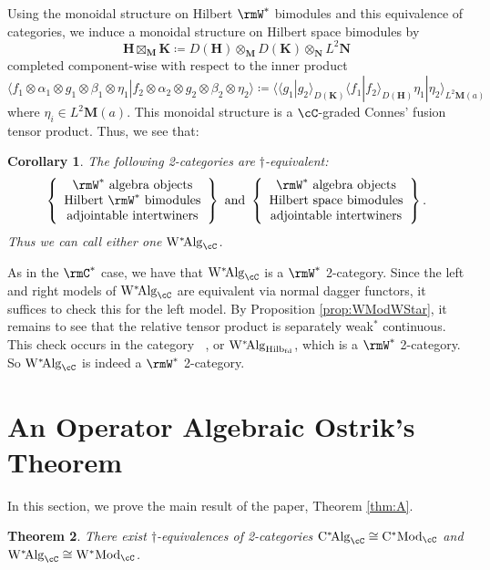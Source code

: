 \documentclass[11pt,reqno]{amsart}
\DeclareMathOperator{\Hilb}{Hilb}
\DeclareMathOperator{\CMod}{C^*Mod}
\DeclareMathOperator{\WMod}{W^*Mod}
\DeclareMathOperator{\CAlg}{C^*\!Alg}
\DeclareMathOperator{\WAlg}{W^*\!Alg}
\newcommand{\bb}[1]{\mathbf{#1}}
\numberwithin{equation}{section}
\theoremstyle{plain}
\newtheorem{thm}{Theorem}[section]
\newtheorem{cor}[thm]{Corollary}
\begin{document}
Using the monoidal structure on Hilbert $\rmW^*$ bimodules and this equivalence of categories, we induce a monoidal structure on Hilbert space bimodules by $$\bb{H} \boxtimes_{\bb M} \bb K \coloneq D(\bb H) \otimes_{\bb M} D(\bb K) \otimes_{\bb N} L^2 \bb N$$ completed component-wise with respect to the inner product $$\langle f_1 \otimes \alpha_1 \otimes g_1 \otimes \beta_1 \otimes \eta_1 | f_2 \otimes \alpha_2 \otimes g_2 \otimes \beta_2 \otimes \eta_2\rangle \coloneq \langle \langle g_1 | g_2 \rangle_{D(\bb K)} \langle f_1 | f_2 \rangle_{D(\bb H)} \eta_1 | \eta_2 \rangle_{L^2 \bb M(a)}$$ where $\eta_i \in L^2 \bb M(a)$.
This monoidal structure is a $\cC$-graded Connes' fusion tensor product.
Thus, we see that:

\begin{cor} \label{cor:WAlgwelldef}
The following 2-categories are $\dagger$-equivalent:
\[
  \left\{ \begin{array}{c}
    \rmW^* \text{ algebra objects} \\
    \text{Hilbert } \rmW^* \text{ bimodules} \\
    \text{adjointable intertwiners}
  \end{array}\right\}
  \text{ and }
  \left\{ \begin{array}{c}
    \rmW^* \text{ algebra objects} \\
    \text{Hilbert space bimodules} \\
    \text{adjointable intertwiners}
  \end{array}\right\}.
\]
Thus we can call either one $\WAlg_{\cC}$.
\end{cor}
As in the $\rmC^*$ case, we have that $\WAlg_{\cC}$ is a $\rmW^*$ 2-category.
Since the left and right models of $\WAlg_{\cC}$ are equivalent via normal dagger functors, it suffices to check this for the left model.
By Proposition \ref{prop:WModWStar}, it remains to see that the relative tensor product is separately weak$^*$ continuous.
This check occurs in the category $\WAlg$, or $\WAlg_{\Hilb_{\rm fd}}$, which is a $\rmW^*$ 2-category.
So $\WAlg_{\cC}$ is indeed a $\rmW^*$ 2-category.

\section{An Operator Algebraic Ostrik's Theorem}
In this section, we prove the main result of the paper,  Theorem \ref{thm:A}.

\begin{thm}
There exist $\dagger$-equivalences of 2-categories $\CAlg_{\cC} \cong \CMod_{\cC}$ and $\WAlg_{\cC} \cong \WMod_{\cC}$.
\end{thm}
\end{document}
